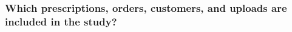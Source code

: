 \subsubsection{Which prescriptions, orders, customers, and uploads are included in the study?}









\clearpage


\clearpage
\linenumbers

\clearpage


